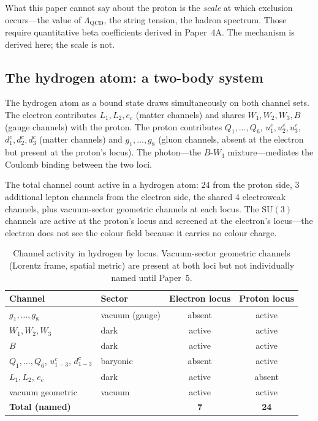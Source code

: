 \documentclass[11pt]{article}
\newcommand{\SU}{\mathrm{SU}}
\begin{document}
What this paper cannot say about the proton is the \emph{scale} at which
exclusion occurs---the value of $\Lambda_{\mathrm{QCD}}$, the string
tension, the hadron spectrum.  Those require quantitative beta
coefficients derived in Paper~4A.  The mechanism is derived here; the
scale is not.

\subsection*{The hydrogen atom: a two-body system}

The hydrogen atom as a bound state draws simultaneously on both channel
sets.  The electron contributes $L_1, L_2, e_c$ (matter channels) and
shares $W_1, W_2, W_3, B$ (gauge channels) with the proton.  The proton
contributes $Q_1,\ldots,Q_6$, $u^c_1, u^c_2, u^c_3$, $d^c_1, d^c_2,
d^c_3$ (matter channels) and $g_1,\ldots,g_8$ (gluon channels, absent
at the electron but present at the proton's locus).  The photon---the
$B$-$W_3$ mixture---mediates the Coulomb binding between the two loci.

The total channel count active in a hydrogen atom: 24 from the proton
side, 3 additional lepton channels from the electron side, the shared 4
electroweak channels, plus vacuum-sector geometric channels at each
locus.  The $\SU(3)$ channels are active at the proton's locus and
screened at the electron's locus---the electron does not see the colour
field because it carries no colour charge.

\begin{table}[h]
\centering\small
\begin{tabular}{llcc}
\toprule
\textbf{Channel} & \textbf{Sector} & \textbf{Electron locus} & \textbf{Proton locus} \\
\midrule
$g_1,\ldots,g_8$ & vacuum (gauge) & absent & active \\
$W_1, W_2, W_3$ & dark & active & active \\
$B$              & dark & active & active \\
$Q_1,\ldots,Q_6$, $u^c_{1-3}$, $d^c_{1-3}$ & baryonic & absent & active \\
$L_1, L_2$, $e_c$ & dark & active & absent \\
vacuum geometric & vacuum & active & active \\
\midrule
\textbf{Total (named)} & & \textbf{7} & \textbf{24} \\
\bottomrule
\end{tabular}
\caption{Channel activity in hydrogen by locus.  Vacuum-sector geometric
channels (Lorentz frame, spatial metric) are present at both loci but not
individually named until Paper~5.}
\end{table}
\end{document}
